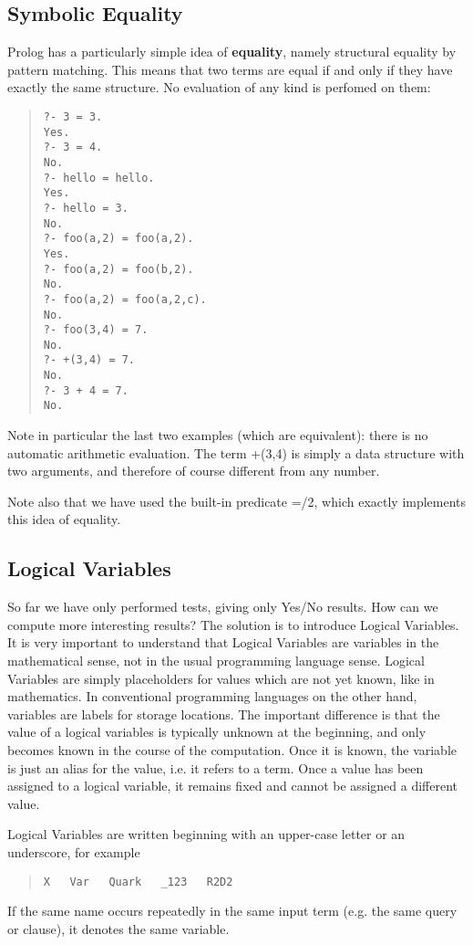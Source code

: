 \subsection{Symbolic Equality}
Prolog has a particularly simple idea of {\bf equality}, namely
structural equality by pattern matching.  This means that two terms
are equal if and only if they have exactly the same structure.  No
evaluation of any kind is perfomed on them:
\begin{quote}\begin{verbatim}
?- 3 = 3.
Yes.
?- 3 = 4.
No.
?- hello = hello.
Yes.
?- hello = 3.
No.
?- foo(a,2) = foo(a,2).
Yes.
?- foo(a,2) = foo(b,2).
No.
?- foo(a,2) = foo(a,2,c).
No.
?- foo(3,4) = 7.
No.
?- +(3,4) = 7.
No.
?- 3 + 4 = 7.
No.
\end{verbatim}\end{quote}
Note in particular the last two examples (which are equivalent):
there is no automatic arithmetic evaluation. The term +(3,4) is simply
a data structure with two arguments, and therefore of course different from
any number.

Note also that we have used the built-in predicate =/2, which exactly
implements this idea of equality.


\subsection{Logical Variables}

 
So far we have only performed tests, giving only Yes/No results.
How can we compute more interesting results? 
The solution is to introduce Logical Variables. 
It is very important to understand that Logical Variables are
variables in the mathematical sense, not in the usual programming
language sense. Logical Variables are simply placeholders for
values which are not yet known, like in mathematics.
In conventional programming languages on the other hand, variables
are labels for storage locations.
The important difference is that the value of a logical variables is
typically unknown at the beginning, and only becomes
known in the course of the computation. Once it is known, the variable is just
an alias for the value, i.e. it refers to a term.
Once a value has been assigned to a logical variable, it remains fixed
and cannot be assigned a different value. 

Logical Variables are written beginning with an upper-case letter or
an underscore, for example
\begin{quote}\begin{verbatim}
X   Var   Quark   _123   R2D2
\end{verbatim}\end{quote}
If the same name occurs repeatedly in the same input term (e.g. the same
query or clause), it denotes the same variable.


